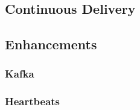 \subsection{Continuous Delivery}

\subsection{Enhancements}

\subsubsection{Kafka}

\subsubsection{Heartbeats}
